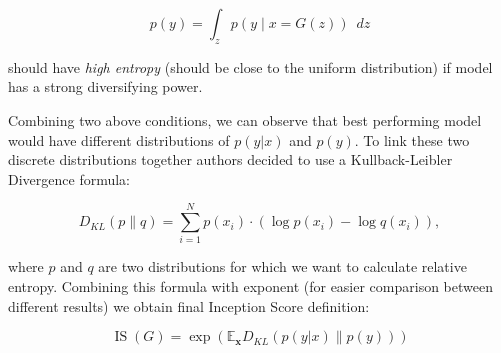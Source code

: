 \documentclass[11pt,a4paper,openany]{book}
\begin{document}
\begin{equation}
p(y) = \int_{z} p(y \mid x=G(z)) \phantom{v} dz
\end{equation}

\noindent should have \textit{high entropy} (should be close to the uniform distribution) if model has a strong diversifying power.\

\noindent Combining two above conditions, we can observe that best performing model would have different distributions of $p(y|x)$ and $p(y)$. To link these two discrete distributions together authors decided to use a Kullback-Leibler Divergence formula:

\begin{equation}
D_{K L}(p \| q)=\sum_{i=1}^{N} p\left(x_{i}\right) \cdot\left(\log p\left(x_{i}\right)-\log q\left(x_{i}\right)\right),
\end{equation}

\noindent where $p$ and $q$ are two distributions for which we want to calculate relative entropy. Combining this formula with exponent (for easier comparison between different results) we obtain final Inception Score definition:

\begin{equation}
\operatorname{IS}(G)=\exp \left(\mathbb{E}_{\mathbf{x}} D_{K L}(p(y|x) \| p(y))\right)
\end{equation}

%
\end{document}
